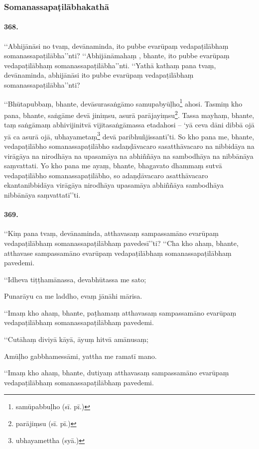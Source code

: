 \subsubsection{Somanassapaṭilābhakathā}

\paragraph{368.} ‘‘Abhijānāsi no tvaṃ, devānaminda, ito pubbe evarūpaṃ vedapaṭilābhaṃ somanassapaṭilābha’’nti? ‘‘Abhijānāmahaṃ , bhante, ito pubbe evarūpaṃ vedapaṭilābhaṃ somanassapaṭilābha’’nti. ‘‘Yathā kathaṃ pana tvaṃ, devānaminda, abhijānāsi ito pubbe evarūpaṃ vedapaṭilābhaṃ somanassapaṭilābha’’nti?

‘‘Bhūtapubbaṃ, bhante, devāsurasaṅgāmo samupabyūḷho\footnote{samūpabbuḷho (sī. pī.)} ahosi. Tasmiṃ kho pana, bhante, saṅgāme devā jiniṃsu, asurā parājayiṃsu\footnote{parājiṃsu (sī. pī.)}. Tassa mayhaṃ, bhante, taṃ saṅgāmaṃ abhivijinitvā vijitasaṅgāmassa etadahosi – ‘yā ceva dāni dibbā ojā yā ca asurā ojā, ubhayametaṃ\footnote{ubhayamettha (syā.)} devā paribhuñjissantī’ti. So kho pana me, bhante, vedapaṭilābho somanassapaṭilābho sadaṇḍāvacaro sasatthāvacaro na nibbidāya na virāgāya na nirodhāya na upasamāya na abhiññāya na sambodhāya na nibbānāya saṃvattati. Yo kho pana me ayaṃ, bhante, bhagavato dhammaṃ sutvā vedapaṭilābho somanassapaṭilābho, so adaṇḍāvacaro asatthāvacaro ekantanibbidāya virāgāya nirodhāya upasamāya abhiññāya sambodhāya nibbānāya saṃvattatī’’ti.

\paragraph{369.} ‘‘Kiṃ pana tvaṃ, devānaminda, atthavasaṃ sampassamāno evarūpaṃ vedapaṭilābhaṃ somanassapaṭilābhaṃ pavedesī’’ti? ‘‘Cha kho ahaṃ, bhante, atthavase sampassamāno evarūpaṃ vedapaṭilābhaṃ somanassapaṭilābhaṃ pavedemi.

‘‘Idheva tiṭṭhamānassa, devabhūtassa me sato;

Punarāyu ca me laddho, evaṃ jānāhi mārisa.

‘‘Imaṃ kho ahaṃ, bhante, paṭhamaṃ atthavasaṃ sampassamāno evarūpaṃ vedapaṭilābhaṃ somanassapaṭilābhaṃ pavedemi.

‘‘Cutāhaṃ diviyā kāyā, āyuṃ hitvā amānusaṃ;

Amūḷho gabbhamessāmi, yattha me ramatī mano.

‘‘Imaṃ kho ahaṃ, bhante, dutiyaṃ atthavasaṃ sampassamāno evarūpaṃ vedapaṭilābhaṃ somanassapaṭilābhaṃ pavedemi.

